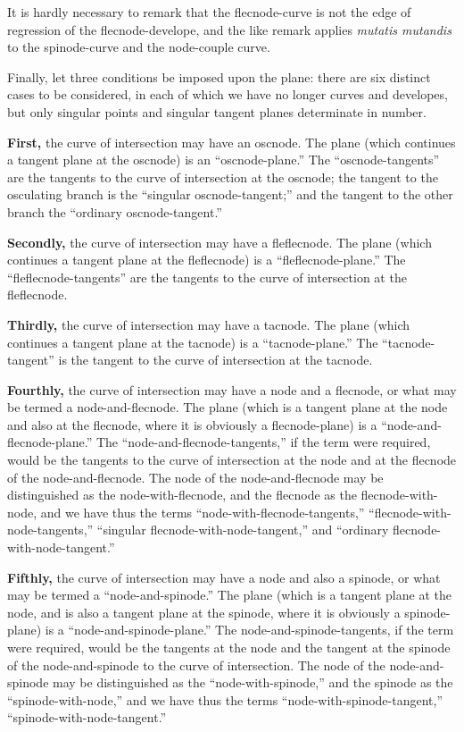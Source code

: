 \documentclass[11pt,a4paper]{article}
\theoremstyle{plain}
\begin{document}
It is hardly necessary to remark that the flecnode-curve is not the edge of regression of the flecnode-develope, and the like remark applies \emph{mutatis mutandis} to the spinode-curve and the node-couple curve.

Finally, let three conditions be imposed upon the plane: there are six distinct cases to be considered, in each of which we have no longer curves and developes, but only singular points and singular tangent planes determinate in number.

\textbf{First,} the curve of intersection may have an oscnode. The plane (which continues a tangent plane at the oscnode) is an ``oscnode-plane.'' The ``oscnode-tangents'' are the tangents to the curve of intersection at the oscnode; the tangent to the osculating branch is the ``singular oscnode-tangent;'' and the tangent to the other branch the ``ordinary oscnode-tangent.''

\textbf{Secondly,} the curve of intersection may have a fleflecnode. The plane (which continues a tangent plane at the fleflecnode) is a ``fleflecnode-plane.'' The ``fleflecnode-tangents'' are the tangents to the curve of intersection at the fleflecnode.

\textbf{Thirdly,} the curve of intersection may have a tacnode. The plane (which continues a tangent plane at the tacnode) is a ``tacnode-plane.'' The ``tacnode-tangent'' is the tangent to the curve of intersection at the tacnode.

\textbf{Fourthly,} the curve of intersection may have a node and a flecnode, or what may be termed a node-and-flecnode. The plane (which is a tangent plane at the node and also at the flecnode, where it is obviously a flecnode-plane) is a ``node-and-flecnode-plane.'' The ``node-and-flecnode-tangents,'' if the term were required, would be the tangents to the curve of intersection at the node and at the flecnode of the node-and-flecnode. The node of the node-and-flecnode may be distinguished as the node-with-flecnode, and the flecnode as the flecnode-with-node, and we have thus the terms ``node-with-flecnode-tangents,'' ``flecnode-with-node-tangents,'' ``singular flecnode-with-node-tangent,'' and ``ordinary flecnode-with-node-tangent.''

\textbf{Fifthly,} the curve of intersection may have a node and also a spinode, or what may be termed a ``node-and-spinode.'' The plane (which is a tangent plane at the node, and is also a tangent plane at the spinode, where it is obviously a spinode-plane) is a ``node-and-spinode-plane.'' The node-and-spinode-tangents, if the term were required, would be the tangents at the node and the tangent at the spinode of the node-and-spinode to the curve of intersection. The node of the node-and-spinode may be distinguished as the ``node-with-spinode,'' and the spinode as the ``spinode-with-node,'' and we have thus the terms ``node-with-spinode-tangent,'' ``spinode-with-node-tangent.''
\end{document}
